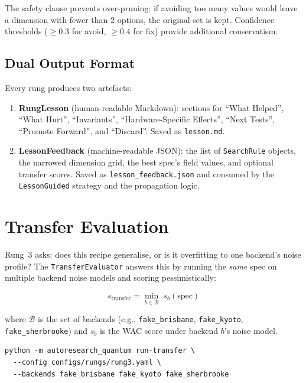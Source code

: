 \documentclass[11pt,a4paper]{article}
\newcommand{\code}[1]{\texttt{#1}}
\newcommand{\file}[1]{\texttt{\small #1}}
\begin{document}
The safety clause prevents over-pruning: if avoiding too many values would
leave a dimension with fewer than 2 options, the original set is kept.
Confidence thresholds ($\geq 0.3$ for avoid, $\geq 0.4$ for fix) provide
additional conservatism.

\subsection{Dual Output Format}
\label{sec:dual}

Every rung produces two artefacts:

\begin{enumerate}
  \item \textbf{RungLesson} (human-readable Markdown): sections for ``What
    Helped'', ``What Hurt'', ``Invariants'', ``Hardware-Specific Effects'',
    ``Next Tests'', ``Promote Forward'', and ``Discard''. Saved as
    \file{lesson.md}.

  \item \textbf{LessonFeedback} (machine-readable JSON): the list of
    \code{SearchRule} objects, the narrowed dimension grid, the best spec's
    field values, and optional transfer scores. Saved as
    \file{lesson\_feedback.json} and consumed by the
    \code{LessonGuided} strategy and the propagation logic.
\end{enumerate}

\section{Transfer Evaluation}
\label{sec:transfer}

Rung~3 asks: does this recipe generalise, or is it overfitting to one backend's
noise profile? The \code{TransferEvaluator} answers this by running the
\emph{same} spec on multiple backend noise models and scoring pessimistically:

\begin{equation}
  s_{\text{transfer}} = \min_{b \in \mathcal{B}} \; s_b(\text{spec})
  \label{eq:transfer}
\end{equation}

where $\mathcal{B}$ is the set of backends (e.g., \code{fake\_brisbane},
\code{fake\_kyoto}, \code{fake\_sherbrooke}) and $s_b$ is the WAC score under
backend $b$'s noise model.

\begin{lstlisting}[style=shell]
python -m autoresearch_quantum run-transfer \
  --config configs/rungs/rung3.yaml \
  --backends fake_brisbane fake_kyoto fake_sherbrooke
\end{lstlisting}
\end{document}
